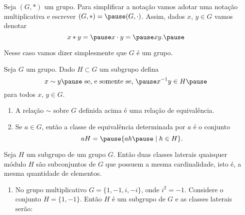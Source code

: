 \documentclass{beamer}
\begin{document}
    \begin{frame}
        Seja $(G, *)$ um grupo. \pause Para simplificar a notação \pause vamos adotar uma notação multiplicativa \pause e escrever $(G, *) = \pause (G, \cdot)$. \pause Assim, dados $x$, $y \in G$ vamos denotar\pause
        \[
            x * y = \pause x \cdot y = \pause xy.\pause
        \]

        Nesse caso vamos dizer simplesmente que $G$ é um grupo.
    \end{frame}

    \begin{frame}
        \begin{proposicao}
            Seja $G$ um grupo. \pause Dado $H \subset G$ um subgrupo \pause defina \pause
            \[
                x \sim y \pause \mbox{ se, e somente se, } \pause x^{-1}y \in H \pause
            \]
            para todos $x$, $y \in G$. \pause
            \begin{enumerate}[label={\roman*})]
                \item A relação $\sim$ \pause sobre $G$ definida acima é uma relação de equivalência. \pause

                \item Se $a \in G$, \pause então a classe de equivalência determinada por $a$ \pause é o conjunto \pause
                \[
                    aH = \pause \{ah \pause \mid h \in H\}.
                \]
            \end{enumerate}
        \end{proposicao}
    \end{frame}

    \begin{frame}
        \begin{proposicao}
            Seja $H$ um subgrupo de um grupo $G$. \pause Então duas classes laterais quaisquer \pause módulo $H$ \pause são subconjuntos de $G$ que possuem a mesma cardinalidade, \pause isto é, a mesma quantidade de elementos. \pause
        \end{proposicao}
    \end{frame}

    \begin{frame}
        \begin{exemplos}
            \begin{enumerate}[label={\roman*})]
                \item No grupo multiplicativo $G = \{1, -1, i, -i\}$, \pause onde $i^2 = -1$. \pause Considere o conjunto $H = \{1, -1\}$. \pause Então $H$ é um subgrupo de $G$ \pause e as classes laterais serão:

                \seti
            \end{enumerate}
        \end{exemplos}
    \end{frame}
\end{document}
